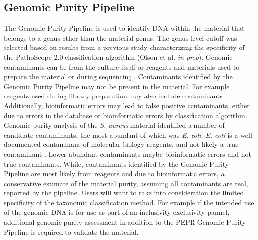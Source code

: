 \documentclass[smallextended]{svjour3}\usepackage[]{graphicx}\usepackage[]{color}
\begin{document}
\subsection{Genomic Purity Pipeline}
 The Genomic Purity Pipeline is used to identify DNA within the material that belongs to a genus other than the material genus.  The genus level cutoff was selected based on results from a previous study characterizing the specificity of the PathoScope 2.0 classification algorithm (Olson et al. \textit{in-prep}). Genomic contaminants can be from the culture itself or reagents and materials used to prepare the material or during sequencing \cite{Shrestha2013, Tang2003, Salter2014}.  Contaminants identified by the Genomic Purity Pipeline may not be present in the material. For example reagents used during library preparation may also include contaminants \cite{Tanner1998, Newsome2004, Motley2014, Salter2014}.  Additionally, bioinformatic errors may lead to false positive contaminants, either due to errors in the database or bioinformatic errors by classification algorithm.  Genomic purity analysis of the \textit{S. aureus} material identified a number of candidate contaminants,  the most abundant of which was \textit{E. coli}.  \textit{E. coli} is a well documented contaminant of molecular biology reagents, and not likely a true contaminant \cite{Salter2014}. Lower abundant contaminants maybe bioinformatic errors and not true contaminants. While, contaminants identified by the Genomic Purity Pipeline are most likely from reagents and due to bioinformatic errors, a conservative estimate of the material purity, assuming all contaminants are real, reported by the pipeline. Users will want to take into consideration the limited specificity of the taxonomic classification method. For example if the intended use of the genomic DNA is for use as part of an inclusivity exclusivity pannel, additional genomic purity assessment in addition to the PEPR Genomic Purity Pipeline is required to validate the material.
\end{document}
